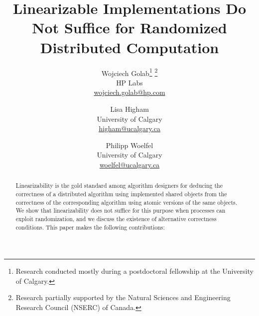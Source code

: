 \documentclass[11pt,letterpaper]{article}
\begin{document}
\title{Linearizable Implementations Do Not Suffice for Randomized Distributed Computation }
\author{Wojciech Golab\thanks{Research conducted mostly during a postdoctoral fellowship at the University of Calgary.}\,\,\thanks{
Research partially supported by the Natural Sciences and Engineering Research Council (NSERC) of Canada.}\\
HP Labs\\
\url{wojciech.golab@hp.com}
\and
Lisa Higham{}\\
University of Calgary\\
\url{higham@ucalgary.ca}
\and Philipp Woelfel{}\\
University of Calgary\\
\url{woelfel@ucalgary.ca}
}


\begin{titlepage}
\maketitle
\thispagestyle{empty}

\begin{abstract}
Linearizability is the gold standard among algorithm designers for deducing the correctness of a distributed algorithm
using implemented shared objects from the correctness of the corresponding algorithm using atomic versions of the same objects.
We show that linearizability does not suffice for this purpose when processes can exploit randomization,
and we discuss the existence of alternative correctness conditions.
This paper makes the following contributions:
\begin{itemize}


\end{itemize}
\end{abstract}
\end{titlepage}
\end{document}
